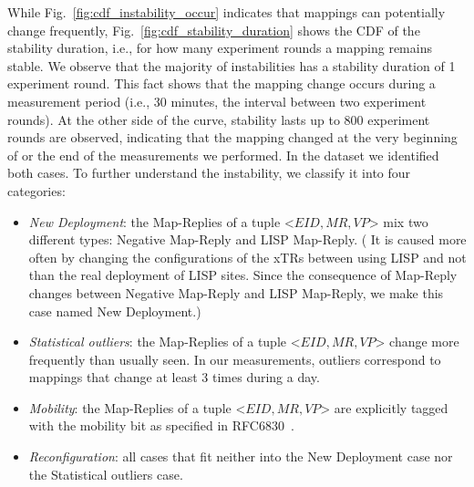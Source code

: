 While Fig.~\ref{fig:cdf_instability_occur} indicates that mappings can potentially change frequently, Fig.~\ref{fig:cdf_stability_duration} shows the CDF of the stability duration, i.e., for how many experiment rounds a mapping remains stable. We observe that the majority of instabilities has a stability duration of 1 experiment round. This fact shows that the mapping change occurs during a measurement period (i.e., 30 minutes, the interval between two experiment rounds). At the other side of the curve, stability lasts up to 800 experiment rounds are observed, indicating that the mapping changed at the very beginning of or the end of the measurements we performed. In the dataset we identified both cases. To further understand the instability, we classify it into four categories:
\begin{itemize}
  \item \emph{New Deployment}: the Map-Replies of a tuple <$EID, MR, VP$> mix two different types: Negative Map-Reply and LISP Map-Reply. (%
  It is caused more often by changing the configurations of the xTRs between using LISP and not than the real deployment of LISP sites. Since the consequence of Map-Reply changes between Negative Map-Reply and LISP Map-Reply, we make this case named New Deployment.)
  \item \emph{Statistical outliers}: the Map-Replies of a tuple <$EID, MR, VP$> change more frequently than usually seen. In our measurements, outliers correspond to mappings that change at least 3 times during a day.    
  \item \emph{Mobility}: the Map-Replies of a tuple <$EID, MR, VP$> are explicitly tagged with the mobility bit as specified in RFC6830~\cite{rfc6830}.  
  \item \emph{Reconfiguration}: all cases that fit neither into the New Deployment case nor the Statistical outliers case.
\end{itemize}

\begin{table}[!tb]
	\centering
	\caption{Percentage of Instabilities by Category}
	\label{tab:Proporition_instability}{
	}
\end{table}

